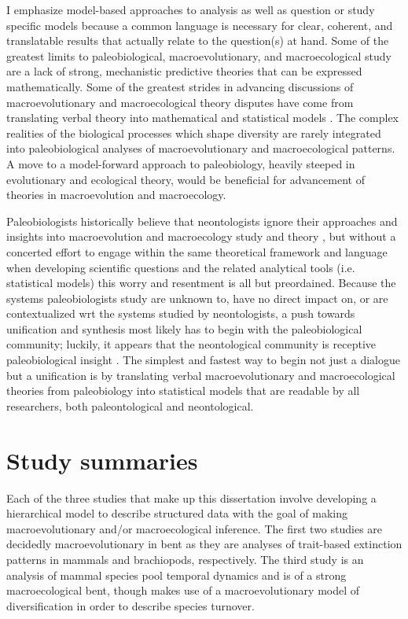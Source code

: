 I emphasize model-based approaches to analysis as well as question or study specific models because a common language is necessary for clear, coherent, and translatable results that actually relate to the question(s) at hand. Some of the greatest limits to paleobiological, macroevolutionary, and macroecological study are a lack of strong, mechanistic predictive theories that can be expressed mathematically. Some of the greatest strides in advancing discussions of macroevolutionary and macroecological theory disputes have come from translating verbal theory into mathematical and statistical models \citep{Raup1973,Nee1992,Felsenstein1985b,Hunt2006a,Hunt2007a,Shipley2006}. The complex realities of the biological processes which shape diversity are rarely integrated into paleobiological analyses of macroevolutionary and macroecological patterns. A move to a model-forward approach to paleobiology, heavily steeped in evolutionary and ecological theory, would be beneficial for advancement of theories in macroevolution and macroecology. 

Paleobiologists historically believe that neontologists ignore their approaches and insights into macroevolution and macroecology study and theory \citep{Sepkoski2009,Sepkoski2015}, but without a concerted effort to engage within the same theoretical framework and language when developing scientific questions and the related analytical tools (i.e. statistical models) this worry and resentment is all but preordained. Because the systems paleobiologists study are unknown to, have no direct impact on, or are contextualized wrt the systems studied by neontologists, a push towards unification and synthesis most likely has to begin with the paleobiological community; luckily, it appears that the neontological community is receptive paleobiological insight \citep{Fritz2013a}. The simplest and fastest way to begin not just a dialogue but a unification is by translating verbal macroevolutionary and macroecological theories from paleobiology into statistical models that are readable by all researchers, both paleontological and neontological.


\section{Study summaries}  %

Each of the three studies that make up this dissertation involve developing a hierarchical model to describe structured data with the goal of making macroevolutionary and/or macroecological inference. The first two studies are decidedly macroevolutionary in bent as they are analyses of trait-based extinction patterns in mammals and brachiopods, respectively. The third study is an analysis of mammal species pool temporal dynamics and is of a strong macroecological bent, though makes use of a macroevolutionary model of diversification in order to describe species turnover.

